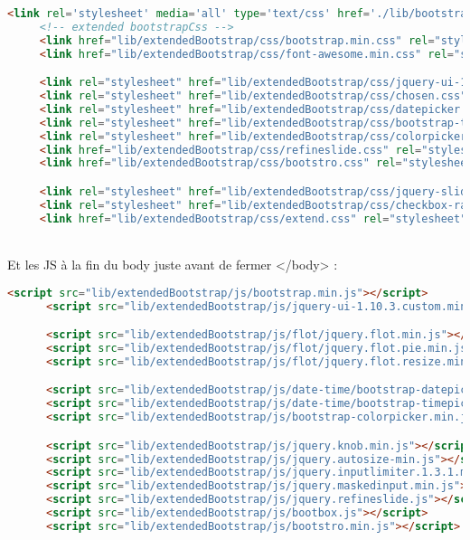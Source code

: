 \begin{DDbox}{\linewidth}
\begin{lstlisting}[language=html]
  <link rel='stylesheet' media='all' type='text/css' href='./lib/bootstrap-3.3.4/dist/css/bootstrap.css' />
	 <!-- extended bootstrapCss -->
	 <link href="lib/extendedBootstrap/css/bootstrap.min.css" rel="stylesheet" />
	 <link href="lib/extendedBootstrap/css/font-awesome.min.css" rel="stylesheet" />

	 <link rel="stylesheet" href="lib/extendedBootstrap/css/jquery-ui-1.10.3.custom.min.css" />
	 <link rel="stylesheet" href="lib/extendedBootstrap/css/chosen.css" />
	 <link rel="stylesheet" href="lib/extendedBootstrap/css/datepicker.css" />
	 <link rel="stylesheet" href="lib/extendedBootstrap/css/bootstrap-timepicker.css" />
	 <link rel="stylesheet" href="lib/extendedBootstrap/css/colorpicker.css" />
	 <link href="lib/extendedBootstrap/css/refineslide.css" rel="stylesheet" />
	 <link href="lib/extendedBootstrap/css/bootstro.css" rel="stylesheet" />

	 <link rel="stylesheet" href="lib/extendedBootstrap/css/jquery-slider.css" />
	 <link rel="stylesheet" href="lib/extendedBootstrap/css/checkbox-radio-switch.css" />
	 <link href="lib/extendedBootstrap/css/extend.css" rel="stylesheet" />
\end{lstlisting}
\end{DDbox}
\\
Et les JS à la fin du body juste avant de fermer </body> :\\
\begin{DDbox}{\linewidth}
\begin{lstlisting}[language=html]
  <script src="lib/extendedBootstrap/js/bootstrap.min.js"></script>
      <script src="lib/extendedBootstrap/js/jquery-ui-1.10.3.custom.min.js"></script>

      <script src="lib/extendedBootstrap/js/flot/jquery.flot.min.js"></script>
      <script src="lib/extendedBootstrap/js/flot/jquery.flot.pie.min.js"></script>
      <script src="lib/extendedBootstrap/js/flot/jquery.flot.resize.min.js"></script>

      <script src="lib/extendedBootstrap/js/date-time/bootstrap-datepicker.min.js"></script>
      <script src="lib/extendedBootstrap/js/date-time/bootstrap-timepicker.min.js"></script>
      <script src="lib/extendedBootstrap/js/bootstrap-colorpicker.min.js"></script>

      <script src="lib/extendedBootstrap/js/jquery.knob.min.js"></script>
      <script src="lib/extendedBootstrap/js/jquery.autosize-min.js"></script>
      <script src="lib/extendedBootstrap/js/jquery.inputlimiter.1.3.1.min.js"></script>
      <script src="lib/extendedBootstrap/js/jquery.maskedinput.min.js"></script>
      <script src="lib/extendedBootstrap/js/jquery.refineslide.js"></script>
      <script src="lib/extendedBootstrap/js/bootbox.js"></script>
      <script src="lib/extendedBootstrap/js/bootstro.min.js"></script>
\end{lstlisting}
\end{DDbox}


